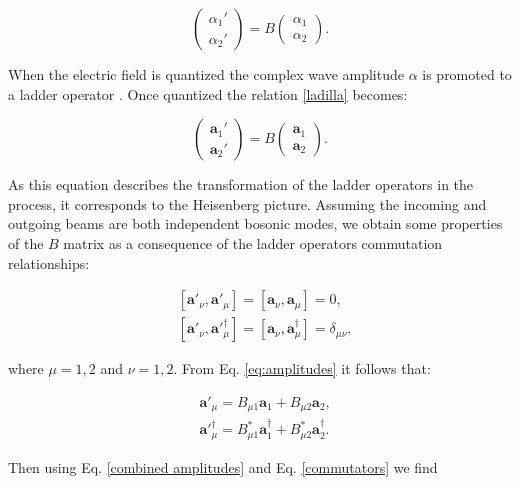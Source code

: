 \documentclass[12pt]{book}
\begin{document}
\begin{equation}
\begin{pmatrix} \alpha_{1}' \\ \alpha_{2}' \end{pmatrix}=B\begin{pmatrix} \alpha_{1} \\ \alpha_{2} \end{pmatrix}. \label{ladilla}
\end{equation}

When the electric field  is quantized the complex wave amplitude $\alpha$ is promoted to a ladder operator \cite{ludon}. Once quantized the relation \ref{ladilla} becomes:

\begin{equation}
\begin{pmatrix} \mathbf{a}_{1}' \\ \mathbf{a}_{2}' \end{pmatrix}=B\begin{pmatrix} \mathbf{a}_{1} \\ \mathbf{a}_{2} \end{pmatrix}.
\label{eq:amplitudes}
\end{equation}

As this equation describes the transformation of the ladder operators in the process, it corresponds to the Heisenberg picture. Assuming the incoming and outgoing beams are both independent bosonic modes, we obtain some properties of the $B$ matrix as a consequence of the ladder operators commutation relationships:

\begin{align}
&[\mathbf{a}'_{\nu},\mathbf{a}'_{\mu}]=[\mathbf{a}_{\nu},\mathbf{a}_{\mu}]=0,\\
&[\mathbf{a}'_{\nu},\mathbf{a}'^{\dagger}_{\mu}]=[\mathbf{a}_{\nu},\mathbf{a}^{\dagger}_{\mu}]=\delta_{\mu \nu},
\label{commutators}
\end{align}

where $\mu=1,2$ and $\nu=1,2$. From Eq. \ref{eq:amplitudes} it follows that:

\begin{align}
&\mathbf{a}'_{\mu}=B_{\mu 1}\mathbf{a}_{1}+B_{\mu 2} \mathbf{a}_{2}, \\
&\mathbf{a}'^{\dagger}_{\mu}=B_{\mu 1}^{*}\mathbf{a}^{\dagger}_{1}+B_{\mu 2}^{*} \mathbf{a}^{\dagger}_{2}.
\label{combined amplitudes}
\end{align}

Then using Eq. \ref{combined amplitudes} and Eq. \ref{commutators} we find 
\end{document}
